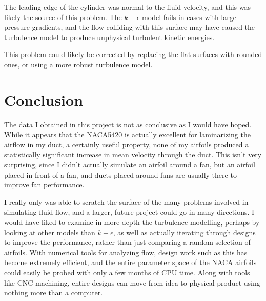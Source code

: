 \documentclass[12pt]{article}
\begin{document}
The leading edge of the cylinder was normal to the fluid velocity, and this 
was likely the source of this problem.  The $k-\epsilon$ model fails in
cases with large pressure gradients, and the flow colliding with this
surface may have caused the turbulence model to produce unphysical turbulent
kinetic energies.

This problem could likely be corrected by replacing the flat surfaces with 
rounded ones, or using a more robust turbulence model.

\section{Conclusion}
The data I obtained in this project is not as conclusive as I would have hoped.
While it appears that the NACA5420 is actually excellent for laminarizing the
airflow in my duct, a certainly useful property, none of my airfoils produced
a statistically significant increase in mean velocity through the duct.  This
isn't very surprising, since I didn't actually simulate an airfoil 
around a fan, but an airfoil placed in front of a fan, and ducts placed around
fans are usually there to improve fan performance.

I really only was able
to scratch the surface of the many problems involved in simulating fluid flow, 
and a larger, future project could go in many directions.  I would have liked to
examine in more depth the turbulence modelling, perhaps by looking at other
models than $k-\epsilon$, as well as actually iterating through designs to
improve the performance, rather than just comparing a random selection of 
airfoils.  With numerical tools for analyzing flow, design work such as this
has become extremely efficient, and the entire parameter space of the NACA
airfoils could easily be probed with only a few months of CPU time.  Along with
tools like CNC machining, entire designs can move from idea to physical 
product using nothing more than a computer.
\end{document}
